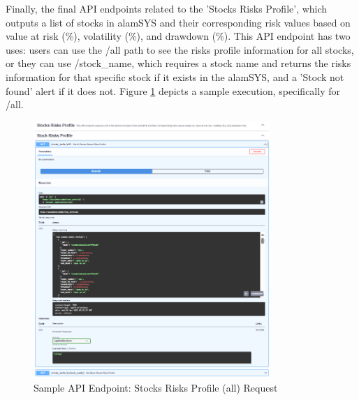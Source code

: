 Finally, the final API endpoints related to the 'Stocks Risks Profile', 
which outputs a list of stocks in alamSYS and their corresponding risk 
values based on value at risk (\%), volatility (\%), and drawdown (\%). 
This API endpoint has two uses: users can use the /all path to see the risks 
profile information for all stocks, or they can use /stock\_name, which 
requires a stock name and returns the risks information for that specific 
stock if it exists in the alamSYS, and a 'Stock not found' alert if it 
does not. Figure \ref{fig:alamAPI_risk} depicts a sample execution, 
specifically for /all.
\begin{figure}[ht]
    \centering
    \includegraphics[width=0.80\textwidth]{./assets/Chapter_4/Documentation/alamAPI_risk.png}
    \caption{Sample API Endpoint: Stocks Risks Profile (all) Request}
    \label{fig:alamAPI_risk}
\end{figure}
\FloatBarrier

